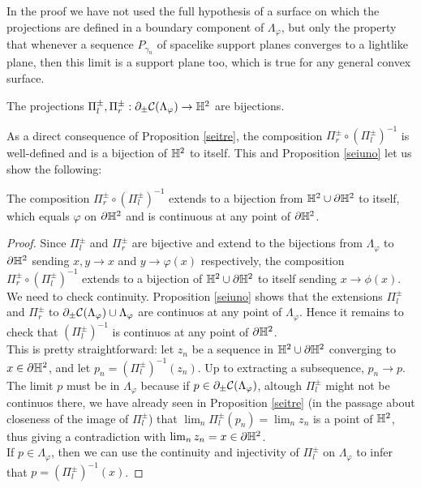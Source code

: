 \begin{observation}
In the proof we have not used the full hypothesis of a surface on which the projections are defined in a boundary component of $\Lambda_\varphi$, but only the property that whenever a sequence $P_{\gamma_n}$ of spacelike support planes converges to a lightlike plane, then this limit is a support plane too, which is true for any general convex surface.
\end{observation}



\begin{proposition}\label{seitre}
    The projections $\Pi_l^\pm, \Pi_r^\pm:\partial_\pm\mathcal{C}(\Lambda_\varphi)\to\mathbb{H}^2$ are bijections. 
\end{proposition}

As a direct consequence of Proposition \ref{seitre}, the composition $\Pi_r^\pm\circ(\Pi_l^\pm)^{-1}$ is well-defined and is a bijection of $\mathbb{H}^2$ to itself. This and Proposition \ref{seiuno} let us show the following: 

\begin{corollary}
    The composition $\Pi_r^\pm\circ(\Pi_l^\pm)^{-1}$ extends to a bijection from $\mathbb{H}^2\cup\partial\mathbb{H}^2$ to itself, which equals $\varphi$ on $\partial\mathbb{H}^2$ and is continuous at any point of $\partial\mathbb{H}^2$.
\end{corollary}
\begin{proof}
    Since $\Pi_l^\pm$ and $\Pi_r^\pm$ are bijective and extend to the bijections from $\Lambda_\varphi$ to $\partial\mathbb{H}^2$ sending $x,y\to x$ and $y\to\varphi(x)$ respectively, the composition $\Pi_r^\pm\circ(\Pi_l^\pm)^{-1}$ extends to a bijection of $\mathbb{H}^2\cup\partial\mathbb{H}^2$ to itself sending $x\to \phi(x).$ \\
    We need to check continuity. Proposition \ref{seiuno} shows that the extensions $\Pi_l^\pm$ and $\Pi_r^\pm$ to $\partial_\pm\mathcal{C}(\Lambda_\varphi)\cup\Lambda_\varphi$ are continuos at any point of $\Lambda_\varphi$. Hence it remains to check that $(\Pi_l^\pm)^{-1}$ is continuos at any point of $\partial\mathbb{H}^{2}$.\\
    This is pretty straightforward: let $z_n$ be a sequence in $\mathbb{H}^2\cup\partial\mathbb{H}^2$ converging to $x\in\partial\mathbb{H}^2$, and let $p_n=(\Pi_l^\pm)^{-1}(z_n)$. Up to extracting a subsequence, $p_n\to p$. The limit $p$ must be in $\Lambda_\varphi$ because if $p\in\partial_\pm\mathcal{C}(\Lambda_\varphi)$, altough $\Pi_l^\pm$ might not be continuos there, we have already seen in Proposition \ref{seitre} (in the passage about closeness of the image of $\Pi_l^\pm$) that $\lim_n\Pi_l^\pm(p_n)=\lim_n z_n$ is a point of $\mathbb{H}^2$, thus giving a contradiction with $\lim_n z_n=x\in\partial\mathbb{H}^2$. \\ 
    If $p\in\Lambda_\varphi$, then we can use the continuity and injectivity of $\Pi_l^\pm$ on $\Lambda_\varphi$ to infer that $p=(\Pi_l^\pm)^{-1}(x)$.

\end{proof}

